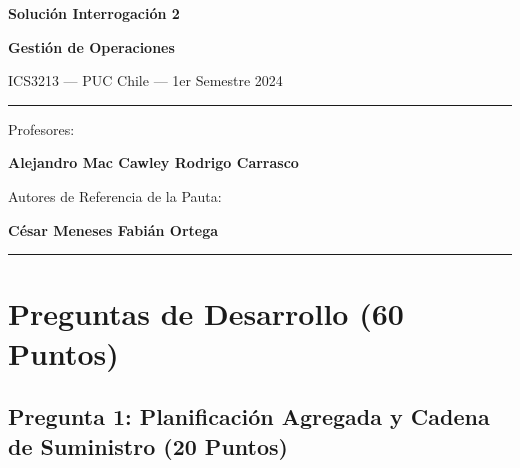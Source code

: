 \documentclass[11pt, a4paper]{article}
\begin{document}
\begin{titlepage}
  \centering
  \vspace*{2cm}
  {\Huge\bfseries\color{gopcyan} Solución Interrogación 2\par}
  \vspace{0.4cm}
  {\LARGE\bfseries Gestión de Operaciones\par}
  \vspace{0.3cm}
  {\large ICS3213 --- PUC Chile --- 1er Semestre 2024\par}
  \vspace{1.2cm}
  \rule{\textwidth}{0.4pt}
  \vspace{0.4cm}

  {\small Profesores:\par}
  {\large\bfseries Alejandro Mac Cawley \quad Rodrigo Carrasco\par}
  \vspace{0.3cm}
  {\small Autores de Referencia de la Pauta:\par}
  {\small\textbf{César Meneses \quad Fabián Ortega}\par}
  \vspace{0.4cm}
  \rule{\textwidth}{0.4pt}
  \vspace{1cm}

  \vfill
\end{titlepage}

\newpage

\section{Preguntas de Desarrollo (60 Puntos)}

\subsection*{Pregunta 1: Planificación Agregada y Cadena de Suministro (20 Puntos)}
\end{document}
